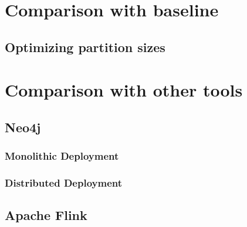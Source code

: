 \section{Comparison with baseline}\label{sec:cmpBaseline}
\subsection{Optimizing partition sizes}\label{sec:partitionSize}
\section{Comparison with other tools}\label{sec:cmpOtherTools}
\subsection{Neo4j}
\subsubsection{Monolithic Deployment}
\subsubsection{Distributed Deployment}
\subsection{Apache Flink}

